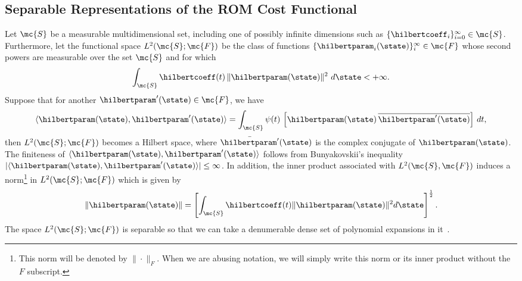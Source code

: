 \subsection{Separable Representations of the ROM Cost Functional}
% 
Let $\mc{S}$ be a measurable multidimensional set, including one of possibly infinite dimensions such as $\{\hilbertcoeff_i\}_{i=0}^\infty \in \mc{S}$. Furthermore, let  the functional space $L^2(\mc{S}; \mc{F})$ be the class of functions $\{\hilbertparam_i(\state)\}_i^\infty \in \mc{F}$ whose second powers are measurable over the set $\mc{S}$ and for which 
%
\begin{align}
	\int_{\mc{S}} \hilbertcoeff(t)  \, \| \hilbertparam(\state)\|^2 \,\, d\state < +\infty.
\end{align}
%
Suppose that for another $\hilbertparam^\prime(\state) \in \mc{F}$, we have
%
\begin{align}
	\langle \hilbertparam(\state), \hilbertparam^\prime(\state) \rangle = \int_{\mc{S}} \psi(t) \, \left[\hilbertparam(\state) \, \overline{\hilbertparam^\prime(\state)} \right] \, dt,
\end{align}
%
then $L^2(\mc{S}; \mc{F})$ becomes a Hilbert space, where $\bar{\hilbertparam^\prime}(\state)$ is the complex conjugate of $\hilbertparam(\state)$. The finiteness of $\langle \hilbertparam(\state), \hilbertparam^\prime(\state) \rangle$ follows from Bunyakovskii's inequality \ie $|\langle \hilbertparam(\state), \hilbertparam^\prime(\state) \rangle| \le \infty$.
In addition, the inner product associated with  $L^2(\mc{S}, \mc{F})$ induces a norm\footnote{This norm will be denoted by $\| \cdot \|_{{F}}$. When we are abusing notation, we will simply write this norm or its inner product without the  $F$ subscript.}  in $L^2(\mc{S}; \mc{F})$ which is given by %
%
%
\begin{align}
	\| \hilbertparam(\state) \| = \left[\int_{\mc{S}} \hilbertcoeff(t) \| \hilbertparam(\state) \|^2 d\state \right]^{\frac{1}{2}}.
\end{align}
%
The space $L^2(\mc{S}; \mc{F})$ is separable so that we can take a denumerable dense set of polynomial expansions in it~\cite{Kantarovich}.%

